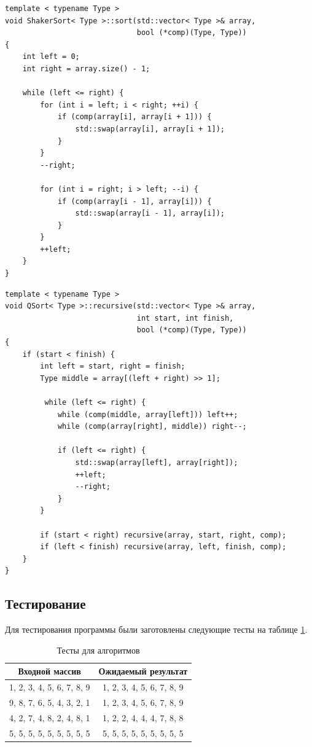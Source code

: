 \documentclass[a4paper,12pt]{article}
\begin{document}
\begin{lstlisting}[caption=Сортировка шейкером,label=list:shaker]
template < typename Type >
void ShakerSort< Type >::sort(std::vector< Type >& array,
                              bool (*comp)(Type, Type))
{
    int left = 0;
    int right = array.size() - 1;

    while (left <= right) {
        for (int i = left; i < right; ++i) {
            if (comp(array[i], array[i + 1])) {
                std::swap(array[i], array[i + 1]);
            }
        }
        --right;

        for (int i = right; i > left; --i) {
            if (comp(array[i - 1], array[i])) {
                std::swap(array[i - 1], array[i]);
            }
        }
        ++left;
    }
}
\end{lstlisting}

\begin{lstlisting}[caption=Быстрая сортировка,label=list:qsort]
template < typename Type >
void QSort< Type >::recursive(std::vector< Type >& array,
                              int start, int finish,
                              bool (*comp)(Type, Type))
{
    if (start < finish) {
        int left = start, right = finish;
        Type middle = array[(left + right) >> 1];

         while (left <= right) {
            while (comp(middle, array[left])) left++;
            while (comp(array[right], middle)) right--;

            if (left <= right) {
                std::swap(array[left], array[right]);
                ++left;
                --right;
            }
        }

        if (start < right) recursive(array, start, right, comp);
        if (left < finish) recursive(array, left, finish, comp);
    }
}
\end{lstlisting}

\subsection{Тестирование}

Для тестирования программы были заготовлены следующие тесты на таблице \ref{table:test}.

\begin{table}[H]
    \centering
    \caption{Тесты для алгоритмов}
    \label{table:test}
    \begin{tabular}{|c|c|}
        \hline
        Входной массив & Ожидаемый результат \\
        \hline
        1, 2, 3, 4, 5, 6, 7, 8, 9 & 1, 2, 3, 4, 5, 6, 7, 8, 9 \\
        \hline
        9, 8, 7, 6, 5, 4, 3, 2, 1 & 1, 2, 3, 4, 5, 6, 7, 8, 9 \\
        \hline
        4, 2, 7, 4, 8, 2, 4, 8, 1 & 1, 2, 2, 4, 4, 4, 7, 8, 8 \\
        \hline
        5, 5, 5, 5, 5, 5, 5, 5, 5 & 5, 5, 5, 5, 5, 5, 5, 5, 5 \\
        \hline
    \end{tabular}
\end{table}
\end{document}
